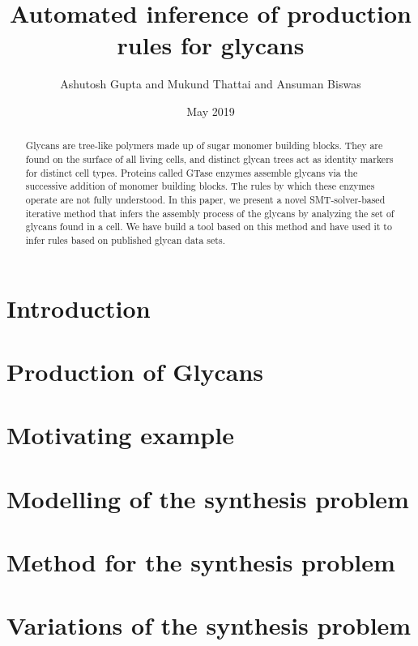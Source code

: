 \documentclass[acmsmall,review,anonymous]{acmart}\settopmatter{printfolios=true,printccs=false,printacmref=false}
\title{Automated inference of production rules for glycans}
\author{Ashutosh Gupta and Mukund Thattai and Ansuman Biswas}
\date{May 2019}
\begin{document}
\begin{abstract}
  Glycans are tree-like polymers made up of sugar monomer building blocks. They are found on the surface of all living cells, and distinct glycan trees act as identity markers for distinct cell types. Proteins called GTase enzymes assemble glycans via the successive addition of monomer building blocks. The rules by which these enzymes operate are not fully understood. In this paper, we present a novel SMT-solver-based iterative method that infers the assembly process of the glycans by analyzing the set of glycans found in a cell. We have build a tool based on this method and have used it to infer rules based on published glycan data sets.
\end{abstract}

\maketitle

\section{Introduction}
\label{sec:intro}


\section{Production of Glycans}
\label{sec:bio}



\section{Motivating example}
\label{sec:motivation}


\section{Modelling of the synthesis problem}
\label{sec:model}



\section{Method for the synthesis problem}
\label{sec:algo}


\section{Variations of the synthesis problem}
\label{sec:variations}

\end{document}
